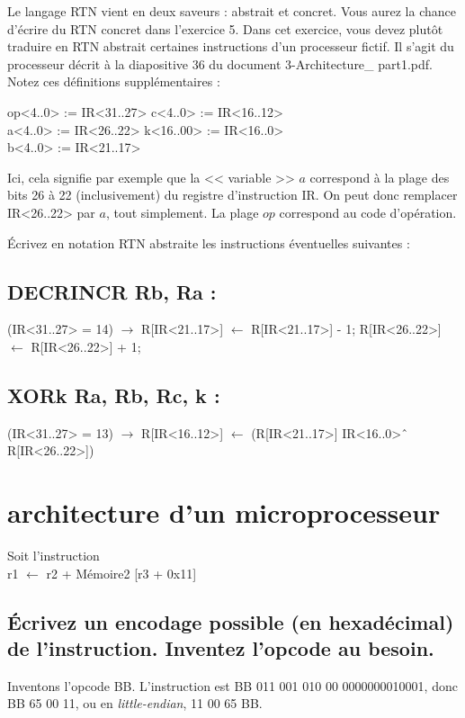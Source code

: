 \documentclass[10pt,letterpaper]{article}
\begin{document}
\noindent Le langage RTN vient en deux saveurs : abstrait et concret. Vous aurez la chance d'écrire du RTN concret dans l'exercice 5. Dans cet exercice, vous devez plutôt traduire en RTN abstrait certaines instructions d'un processeur fictif. Il s'agit du processeur décrit à la diapositive 36 du document 3-Architecture\_ part1.pdf. Notez ces définitions supplémentaires :
\vspace{5mm}

\noindent
op<4..0> := IR<31..27> \qquad \qquad c<4..0> := IR<16..12> \\
a<4..0> := IR<26..22> \qquad \qquad k<16..00> := IR<16..0> \\
b<4..0> := IR<21..17>
\vspace{5mm}

\noindent Ici, cela signifie par exemple que la << variable >> $a$ correspond à la plage des bits 26 à 22 (inclusivement) du registre d'instruction IR. On peut donc remplacer IR<26..22> par $a$, tout simplement. La plage $op$ correspond au code d'opération.
\vspace{5mm}

\noindent Écrivez en notation RTN abstraite les instructions éventuelles suivantes :
\subsection{DECRINCR Rb, Ra :}
(IR<31..27> = 14) $\to$ R[IR<21..17>] $\gets$  R[IR<21..17>] - 1; R[IR<26..22>] $\gets$  R[IR<26..22>] + 1;
\bigskip

\subsection{XORk Ra, Rb, Rc, k :}
(IR<31..27> = 13) $\to$ R[IR<16..12>] $\gets$ (R[IR<21..17>] \text{<}\text{<} IR<16..0> \^ \, R[IR<26..22>])

\newpage
\section{architecture d'un microprocesseur}
Soit l'instruction \\
\hspace{2em} r1 $\gets$ r2 + Mémoire2 [r3 + 0x11]
\subsection{Écrivez un encodage possible (en hexadécimal) de l'instruction. Inventez l'opcode au besoin.}
Inventons l'opcode BB. L'instruction est BB 011 001 010 00 0000000010001, donc BB 65 00 11, ou en \textit{little-endian}, 11 00 65 BB.
\medskip
\end{document}
